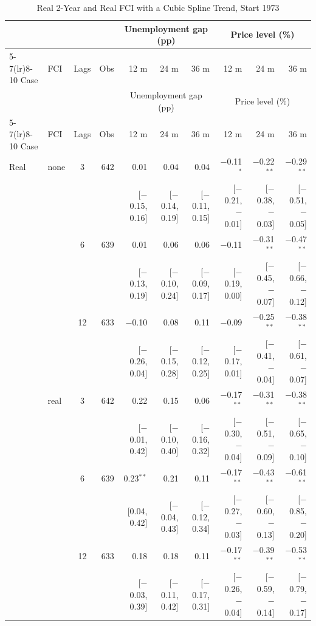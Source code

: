 \begingroup\scriptsize\setlength{\tabcolsep}{0.9pt}
\begin{longtable}{llcrrrrrrr}
\caption{Real 2-Year and Real FCI with a Cubic Spline Trend, Start 1973}\label{tab:appR2d}\\
\toprule
 & & & & \multicolumn{3}{c}{Unemployment gap (pp)} & \multicolumn{3}{c}{Price level (\%)}\\ \cmidrule(lr){5-7}\cmidrule(lr){8-10}
Case & FCI & Lags & Obs & 12 m & 24 m & 36 m & 12 m & 24 m & 36 m\\
\midrule\endfirsthead
\toprule
 & & & & \multicolumn{3}{c}{Unemployment gap (pp)} & \multicolumn{3}{c}{Price level (\%)}\\ \cmidrule(lr){5-7}\cmidrule(lr){8-10}
Case & FCI & Lags & Obs & 12 m & 24 m & 36 m & 12 m & 24 m & 36 m\\
\midrule\endhead
\bottomrule\endfoot
Real & none & 3 & 642 & 0.01 & 0.04 & 0.04 & $-$0.11$^{*}$ & $-$0.22$^{**}$ & $-$0.29$^{**}$\\
 & & & & {\scriptsize [$-$0.15, 0.16]} & {\scriptsize [$-$0.14, 0.19]} & {\scriptsize [$-$0.11, 0.15]} & {\scriptsize [$-$0.21, $-$0.01]} & {\scriptsize [$-$0.38, $-$0.03]} & {\scriptsize [$-$0.51, $-$0.05]}\\
 &  & 6 & 639 & 0.01 & 0.06 & 0.06 & $-$0.11 & $-$0.31$^{**}$ & $-$0.47$^{**}$\\
 & & & & {\scriptsize [$-$0.13, 0.19]} & {\scriptsize [$-$0.10, 0.24]} & {\scriptsize [$-$0.09, 0.17]} & {\scriptsize [$-$0.19, 0.00]} & {\scriptsize [$-$0.45, $-$0.07]} & {\scriptsize [$-$0.66, $-$0.12]}\\
 &  & 12 & 633 & $-$0.10 & 0.08 & 0.11 & $-$0.09 & $-$0.25$^{**}$ & $-$0.38$^{**}$\\
 & & & & {\scriptsize [$-$0.26, 0.04]} & {\scriptsize [$-$0.15, 0.28]} & {\scriptsize [$-$0.12, 0.25]} & {\scriptsize [$-$0.17, 0.01]} & {\scriptsize [$-$0.41, $-$0.04]} & {\scriptsize [$-$0.61, $-$0.07]}\\
 & real & 3 & 642 & 0.22 & 0.15 & 0.06 & $-$0.17$^{**}$ & $-$0.31$^{**}$ & $-$0.38$^{**}$\\
 & & & & {\scriptsize [$-$0.01, 0.42]} & {\scriptsize [$-$0.10, 0.40]} & {\scriptsize [$-$0.16, 0.32]} & {\scriptsize [$-$0.30, $-$0.04]} & {\scriptsize [$-$0.51, $-$0.09]} & {\scriptsize [$-$0.65, $-$0.10]}\\
 &  & 6 & 639 & 0.23$^{**}$ & 0.21 & 0.11 & $-$0.17$^{**}$ & $-$0.43$^{**}$ & $-$0.61$^{**}$\\
 & & & & {\scriptsize [0.04, 0.42]} & {\scriptsize [$-$0.04, 0.43]} & {\scriptsize [$-$0.12, 0.34]} & {\scriptsize [$-$0.27, $-$0.03]} & {\scriptsize [$-$0.60, $-$0.13]} & {\scriptsize [$-$0.85, $-$0.20]}\\
 &  & 12 & 633 & 0.18 & 0.18 & 0.11 & $-$0.17$^{**}$ & $-$0.39$^{**}$ & $-$0.53$^{**}$\\
 & & & & {\scriptsize [$-$0.03, 0.39]} & {\scriptsize [$-$0.11, 0.42]} & {\scriptsize [$-$0.17, 0.31]} & {\scriptsize [$-$0.26, $-$0.04]} & {\scriptsize [$-$0.59, $-$0.14]} & {\scriptsize [$-$0.79, $-$0.17]}\\
\end{longtable}
